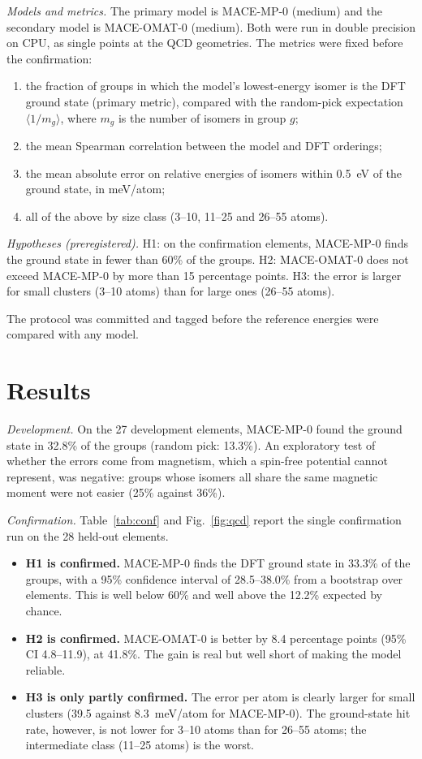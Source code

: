 \documentclass[11pt]{article}
\begin{document}
\textit{Models and metrics.} The primary model is MACE-MP-0 (medium) and the secondary model is MACE-OMAT-0
(medium). Both were run in double precision on CPU, as single points at the QCD geometries. The metrics were fixed
before the confirmation:
\begin{enumerate}
\item the fraction of groups in which the model's lowest-energy isomer is the DFT ground state (primary metric),
compared with the random-pick expectation $\langle 1/m_g\rangle$, where $m_g$ is the number of isomers in group
$g$;
\item the mean Spearman correlation between the model and DFT orderings;
\item the mean absolute error on relative energies of isomers within 0.5~eV of the ground state, in meV/atom;
\item all of the above by size class (3--10, 11--25 and 26--55 atoms).
\end{enumerate}

\textit{Hypotheses (preregistered).} H1: on the confirmation elements, MACE-MP-0 finds the ground state in fewer than
60\% of the groups. H2: MACE-OMAT-0 does not exceed MACE-MP-0 by more than 15 percentage points. H3: the error is
larger for small clusters (3--10 atoms) than for large ones (26--55 atoms).

The protocol was committed and tagged before the reference energies were compared with any model.

\section{Results}
\textit{Development.} On the 27 development elements, MACE-MP-0 found the ground state in 32.8\% of the groups
(random pick: 13.3\%). An exploratory test of whether the errors come from magnetism, which a spin-free potential
cannot represent, was negative: groups whose isomers all share the same magnetic moment were not easier
(25\% against 36\%).

\textit{Confirmation.} Table~\ref{tab:conf} and Fig.~\ref{fig:qcd} report the single confirmation run on the 28
held-out elements.
\begin{itemize}
\item \textbf{H1 is confirmed.} MACE-MP-0 finds the DFT ground state in 33.3\% of the groups, with a 95\%
confidence interval of 28.5--38.0\% from a bootstrap over elements. This is well below 60\% and well above the
12.2\% expected by chance.
\item \textbf{H2 is confirmed.} MACE-OMAT-0 is better by 8.4 percentage points (95\% CI 4.8--11.9), at 41.8\%. The
gain is real but well short of making the model reliable.
\item \textbf{H3 is only partly confirmed.} The error per atom is clearly larger for small clusters (39.5 against
8.3~meV/atom for MACE-MP-0). The ground-state hit rate, however, is not lower for 3--10 atoms than for 26--55
atoms; the intermediate class (11--25 atoms) is the worst.
\end{itemize}
\end{document}
